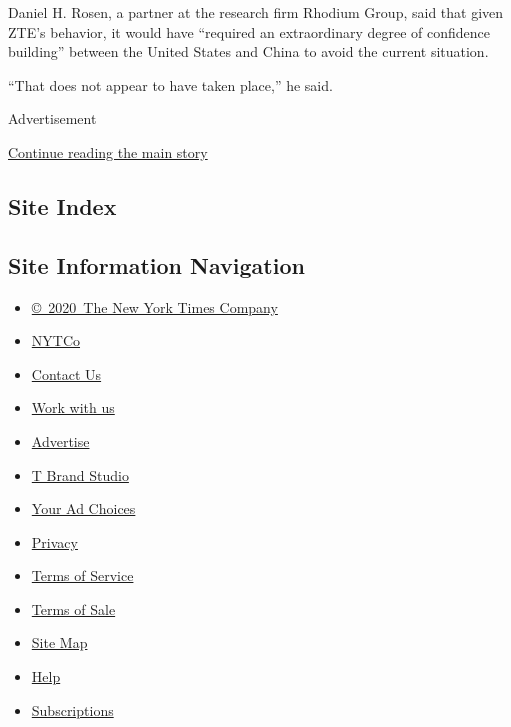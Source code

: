 Daniel H. Rosen, a partner at the research firm Rhodium Group, said that
given ZTE's behavior, it would have ``required an extraordinary degree
of confidence building'' between the United States and China to avoid
the current situation.

``That does not appear to have taken place,'' he said.

Advertisement

\protect\hyperlink{after-bottom}{Continue reading the main story}

\hypertarget{site-index}{%
\subsection{Site Index}\label{site-index}}

\hypertarget{site-information-navigation}{%
\subsection{Site Information
Navigation}\label{site-information-navigation}}

\begin{itemize}
\tightlist
\item
  \href{https://help.nytimes.com/hc/en-us/articles/115014792127-Copyright-notice}{©~2020~The
  New York Times Company}
\end{itemize}

\begin{itemize}
\tightlist
\item
  \href{https://www.nytco.com/}{NYTCo}
\item
  \href{https://help.nytimes.com/hc/en-us/articles/115015385887-Contact-Us}{Contact
  Us}
\item
  \href{https://www.nytco.com/careers/}{Work with us}
\item
  \href{https://nytmediakit.com/}{Advertise}
\item
  \href{http://www.tbrandstudio.com/}{T Brand Studio}
\item
  \href{https://www.nytimes.com/privacy/cookie-policy\#how-do-i-manage-trackers}{Your
  Ad Choices}
\item
  \href{https://www.nytimes.com/privacy}{Privacy}
\item
  \href{https://help.nytimes.com/hc/en-us/articles/115014893428-Terms-of-service}{Terms
  of Service}
\item
  \href{https://help.nytimes.com/hc/en-us/articles/115014893968-Terms-of-sale}{Terms
  of Sale}
\item
  \href{https://spiderbites.nytimes.com}{Site Map}
\item
  \href{https://help.nytimes.com/hc/en-us}{Help}
\item
  \href{https://www.nytimes.com/subscription?campaignId=37WXW}{Subscriptions}
\end{itemize}
